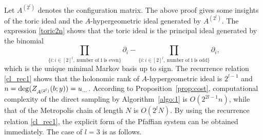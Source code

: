 \documentclass[a4paper,12pt]{article}
\theoremstyle{plain}
\theoremstyle{remark}
\begin{document}
Let $A^{(2^l)}$ denotes the configuration matrix. The above proof
gives some insights of the toric ideal and the $A$-hypergeometric
ideal generated by $A^{(2^l)}$. The expression \eqref{toric2n}
shows that the toric ideal is the principal ideal generated by
the binomial
\[
  \prod_{\{i:i\in[2]^l,~\text{number~of}~1~\text{is~even}\}}\partial_i
 -\prod_{\{i:i\in[2]^l,~\text{number~of}~1~\text{is~odd}\}}\partial_i,
\]
which is the unique minimal Markov basis up to sign.
The recurrence relation \eqref{cl_rec1} shows that
the holonomic rank of $A$-hypergeometric ideal is $2^{l-1}$
and $n={\rm deg}(Z_{A^{(2^l)}}(b;y))=u_{\ldots}$.
According to Proposition~\ref{prop:cost}, computational complexity
of the direct sampling by Algorithm~\ref{algo:1} is $O(2^{2l-1}n)$,
while that of the Metropolis chain of length $N$ is $O(2^lN)$.
By using the recurrence relation \eqref{cl_rec1}, the explicit
form of the Pfaffian system can be obtained immediately.
The case of $l=3$ is as follows.
\end{document}

